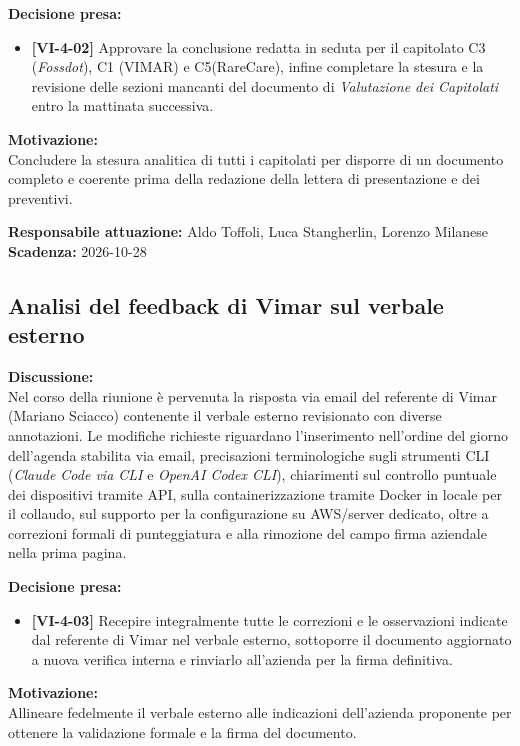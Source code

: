\documentclass[12pt,a4paper]{article}
\newcommand{\tightlist}{\setlength{\itemsep}{1pt}\setlength{\parskip}{0pt}}
\begin{document}
\textbf{Decisione presa:}
\begin{itemize}
\tightlist
\item[$\checkmark$] \textbf{[VI-4-02]} Approvare la conclusione redatta in seduta per il capitolato C3 (\emph{Fossdot}), C1 (VIMAR) e C5(RareCare), infine completare la stesura e la revisione delle sezioni mancanti del documento di \emph{Valutazione dei Capitolati} entro la mattinata successiva.
\end{itemize}

\textbf{Motivazione:} \\
Concludere la stesura analitica di tutti i capitolati per disporre di un documento completo e coerente prima della redazione della lettera di presentazione e dei preventivi.

\textbf{Responsabile attuazione:} Aldo Toffoli, Luca Stangherlin, Lorenzo Milanese \\
\textbf{Scadenza:} 2026-10-28

\hypertarget{argomento-3}{%
\subsection{Analisi del feedback di Vimar sul verbale esterno}}

\textbf{Discussione:} \\
Nel corso della riunione è pervenuta la risposta via email del referente di Vimar (Mariano Sciacco) contenente il verbale esterno revisionato con diverse annotazioni. Le modifiche richieste riguardano l'inserimento nell'ordine del giorno dell'agenda stabilita via email, precisazioni terminologiche sugli strumenti CLI (\emph{Claude Code via CLI} e \emph{OpenAI Codex CLI}), chiarimenti sul controllo puntuale dei dispositivi tramite API, sulla containerizzazione tramite Docker in locale per il collaudo, sul supporto per la configurazione su AWS/server dedicato, oltre a correzioni formali di punteggiatura e alla rimozione del campo firma aziendale nella prima pagina.

\textbf{Decisione presa:}
\begin{itemize}
\tightlist
\item[$\checkmark$] \textbf{[VI-4-03]} Recepire integralmente tutte le correzioni e le osservazioni indicate dal referente di Vimar nel verbale esterno, sottoporre il documento aggiornato a nuova verifica interna e rinviarlo all'azienda per la firma definitiva.
\end{itemize}

\textbf{Motivazione:} \\
Allineare fedelmente il verbale esterno alle indicazioni dell'azienda proponente per ottenere la validazione formale e la firma del documento.
\end{document}

